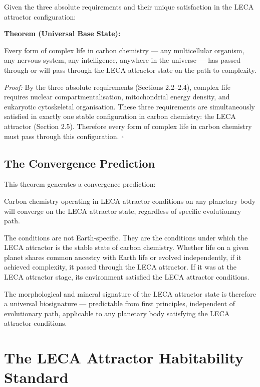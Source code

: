 \documentclass[11pt, a4paper]{article}
\begin{document}
Given the three absolute requirements and their unique
satisfaction in the LECA attractor configuration:

\begin{mdframed}[
  linecolor=rulecolor,
  linewidth=0.8pt,
  innertopmargin=0.5em,
  innerbottommargin=0.5em,
  innerleftmargin=1em,
  innerrightmargin=1em
]
\textbf{Theorem (Universal Base State):}

Every form of complex life in carbon chemistry ---
any multicellular organism, any nervous system,
any intelligence, anywhere in the universe ---
has passed through or will pass through the LECA
attractor state on the path to complexity.

\textit{Proof:} By the three absolute requirements
(Sections 2.2--2.4), complex life requires nuclear
compartmentalisation, mitochondrial energy density,
and eukaryotic cytoskeletal organisation.
These three requirements are simultaneously satisfied
in exactly one stable configuration in carbon chemistry:
the LECA attractor (Section 2.5).
Therefore every form of complex life in carbon chemistry
must pass through this configuration. $\square$
\end{mdframed}

\subsection{The Convergence Prediction}

This theorem generates a convergence prediction:

Carbon chemistry operating in LECA attractor conditions
on any planetary body will converge on the LECA attractor
state, regardless of specific evolutionary path.

The conditions are not Earth-specific. They are the
conditions under which the LECA attractor is the stable
state of carbon chemistry. Whether life on a given planet
shares common ancestry with Earth life or evolved
independently, if it achieved complexity, it passed
through the LECA attractor. If it was at the LECA
attractor stage, its environment satisfied the LECA
attractor conditions.

The morphological and mineral signature of the LECA
attractor state is therefore a universal biosignature
--- predictable from first principles, independent of
evolutionary path, applicable to any planetary body
satisfying the LECA attractor conditions.

\section{The LECA Attractor Habitability Standard}
\end{document}
